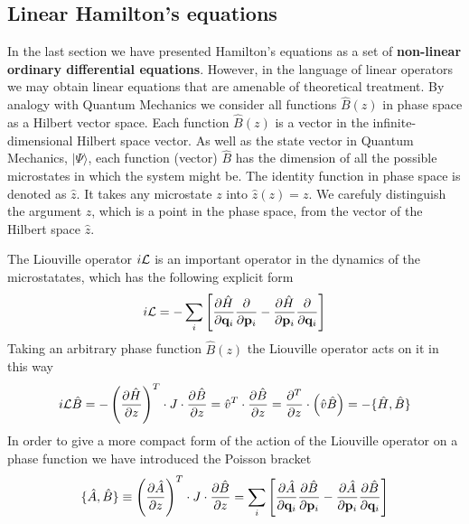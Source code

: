 \documentclass[a4paper,openright,12pt]{book}
\newcommand{\Note}[1]{{\bf \color{red}#1}}    %
\begin{document}
\subsection{Linear Hamilton's equations}
In the last section we have presented Hamilton's equations as a set of \Note{non-linear ordinary differential equations}. However, in the language of linear operators we may obtain linear equations that are amenable of theoretical treatment. 
By analogy with Quantum Mechanics we consider all functions $\hat{B}(z)$ in phase space as a Hilbert vector space. Each function $\hat{B}(z)$ is a vector in the infinite-dimensional Hilbert space vector. As well as the state vector in Quantum Mechanics, $|\Psi\rangle$, each function (vector) $\hat{B}$ has the dimension of all the possible microstates in which the system might be. 
The identity function in phase space is denoted as $\hat{z}$. It takes any microstate $z$ into $\hat{z}(z)=z$. 
We carefuly distinguish the argument $z$, which is a point in the phase space, from the vector of the Hilbert space $\hat{z}$.     


The Liouville operator $i{\cal L}$ is an important operator in the dynamics of the microstatates, which has the following explicit form 
\begin{equation}
    i{\cal L} = -
    \sum_i\left[\frac{\partial \hat{H}}{\partial {\bf q}_i}
\frac{\partial    }{\partial {\bf p}_i}-
\frac{\partial \hat{H}}{\partial {\bf p}_i}
\frac{\partial }{\partial {\bf q}_i}\right]
\label{iL}
\end{equation}
Taking an arbitrary phase function $\hat{B}(z)$ the Liouville operator acts on it in this way
\begin{align}
  i{\cal L}\hat{B}=-\left(\frac{\partial\hat{H}}{\partial z}\right)^T\cdot J\cdot\frac{\partial\hat{B}}{\partial z}
  =\hat{v}^T\cdot\frac{\partial\hat{B}}{\partial z}
  = \frac{\partial^T}{\partial z}\cdot\left(\hat{v}\hat{B}\right) 
  = -\{\hat{H},\hat{B}\}
  \label{iLB}
\end{align}
In order to give a more compact form of the action of the Liouville operator on a phase function we have introduced the Poisson bracket
\begin{align}
  \{\hat{A},\hat{B}\}\equiv\left(\frac{\partial\hat{A}}{\partial z}\right)^T\cdot J\cdot\frac{\partial\hat{B}}{\partial z}= 
  \sum_i\left[\frac{\partial \hat{A}}{\partial {\bf q}_i}
    \frac{\partial \hat{B}}{\partial {\bf p}_i}-          
    \frac{\partial \hat{A}}{\partial {\bf p}_i}
  \frac{\partial\hat{B} }{\partial {\bf q}_i}\right]
    \label{PoissonBracket}
\end{align}
\end{document}
